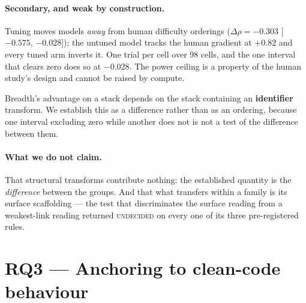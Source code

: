 \documentclass[sigconf,review,anonymous]{acmart}
\newcommand{\vok}{\textsuperscript{\checkmark}}
\newcommand{\vrefuted}{\textsuperscript{\texttimes}}
\newcommand{\vinc}{\textsuperscript{$\circ$}}
\begin{document}
\paragraph{Secondary, and weak by construction.} Tuning moves models \emph{away} from human
difficulty orderings ($\Delta\rho = -0.303$ [$-0.575$, $-0.028$]); the untuned model tracks the
human gradient at $+0.82$ and every tuned arm inverts it. One trial per cell over 98 cells, and the
one interval that clears zero does so at $-0.028$. The power ceiling is a property of the human
study's design and cannot be raised by compute.

Breadth's advantage on a stack depends on the stack containing an \textbf{identifier} transform.
We establish this as a difference rather than as an ordering, because one interval excluding zero
while another does not is not a test of the difference between them.

\begin{table}[t]\centering\small
\caption{Breadth's gain over the clean-code control, per composite, on stacks containing the
held-out family; and the identifier-versus-structural difference on two independent stimulus sets.
The rule defining the split was fixed \textbf{before} the unseen-containing stimulus existed.}
\label{tab:split}

\end{table}

\paragraph{What we do not claim.} That structural transforms contribute nothing: the established
quantity is the \emph{difference} between the groups. And that what transfers within a family is
its surface scaffolding --- the test that discriminates the surface reading from a weakest-link
reading returned \textsc{undecided} on every one of its three pre-registered rules.

\section{RQ3 --- Anchoring to clean-code behaviour}
\label{sec:rq3}

\begin{table}[t]\centering\small
\caption{Eight models, four lineages, one evaluation phase. \vok\ replicated, \vinc\ inconclusive,
\vrefuted\ refuted. Bold intervals exclude zero.}
\label{tab:panel}

\end{table}
\end{document}
